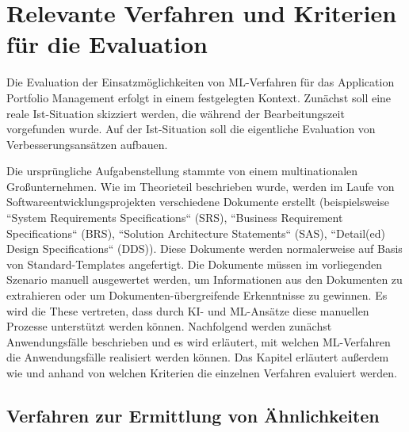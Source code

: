 \chapter{Relevante Verfahren und Kriterien für die Evaluation}
\label{kriterien}

Die Evaluation der Einsatzmöglichkeiten von ML-Verfahren für das Application Portfolio Management erfolgt in einem festgelegten Kontext. Zunächst soll eine reale Ist-Situation skizziert werden, die während der Bearbeitungszeit vorgefunden wurde.  Auf der Ist-Situation soll die eigentliche Evaluation von Verbesserungsansätzen aufbauen. 

Die ursprüngliche Aufgabenstellung stammte von einem multinationalen Großunternehmen. Wie im Theorieteil beschrieben wurde, werden im Laufe von Softwareentwicklungsprojekten verschiedene Dokumente erstellt (beispielsweise ``System Requirements Specifications`` (SRS), ``Business Requirement Specifications`` (BRS), ``Solution Architecture Statements`` (SAS), ``Detail(ed) Design Specifications`` (DDS)). Diese Dokumente werden normalerweise auf Basis von Standard-Templates angefertigt. Die Dokumente müssen im vorliegenden Szenario manuell ausgewertet werden, um Informationen aus den Dokumenten zu extrahieren oder um Dokumenten-übergreifende Erkenntnisse zu gewinnen. Es wird die These vertreten, dass durch KI- und ML-Ansätze diese manuellen Prozesse unterstützt werden können. Nachfolgend werden zunächst Anwendungsfälle beschrieben und es wird erläutert, mit welchen ML-Verfahren die Anwendungsfälle realisiert werden können. Das Kapitel erläutert außerdem wie und anhand von welchen Kriterien die einzelnen Verfahren evaluiert werden. 

\section{Verfahren zur Ermittlung von Ähnlichkeiten}


